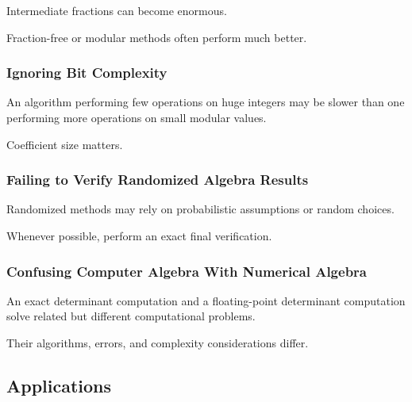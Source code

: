 Intermediate fractions can become enormous.

Fraction-free or modular methods often perform much better.

\subsubsection{Ignoring Bit Complexity}

An algorithm performing few operations on huge integers may be slower than
one performing more operations on small modular values.

Coefficient size matters.

\subsubsection{Failing to Verify Randomized Algebra Results}

Randomized methods may rely on probabilistic assumptions or random choices.

Whenever possible, perform an exact final verification.

\subsubsection{Confusing Computer Algebra With Numerical Algebra}

An exact determinant computation and a floating-point determinant
computation solve related but different computational problems.

Their algorithms, errors, and complexity considerations differ.

\subsection{Applications}
\label{subsec:computer-algebra-applications}

